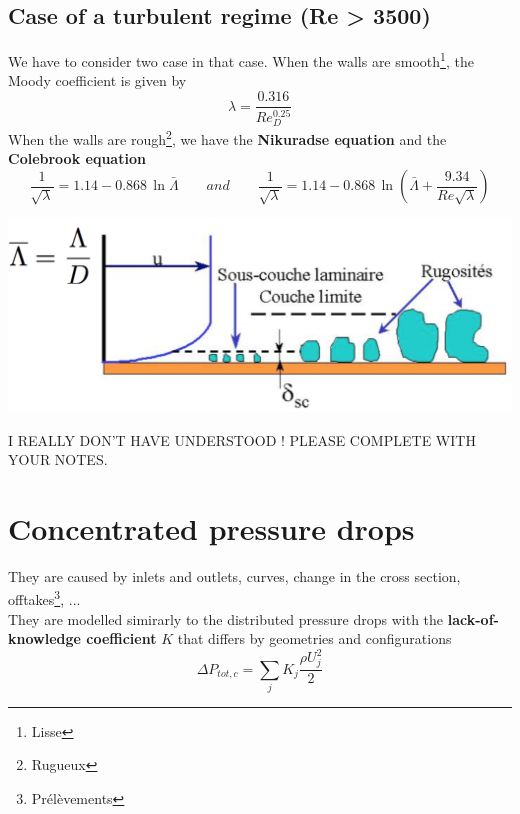 	\subsection{Case of a turbulent regime (Re > 3500)}
		We have to consider two case in that case. When the walls are smooth\footnote{Lisse}, the Moody coefficient is given by 
		\begin{equation}
			\lambda = \frac{0.316}{Re_D^{0.25}}
		\end{equation}
		When the walls are rough\footnote{Rugueux}, we have the \textbf{Nikuradse equation} and the \textbf{Colebrook equation}
		\begin{equation}
			\frac{1}{\sqrt{\lambda}} = 1.14 - 0.868 \, \ln \bar{\Lambda}
			\qquad and \qquad
			\frac{1}{\sqrt{\lambda}} = 1.14 - 0.868 \, \ln \left(\bar{\Lambda}+\frac{9.34}{Re\sqrt{\lambda}} \right)
		\end{equation}
\begin{center}
		\includegraphics[scale=0.4]{ch2/7}
\end{center}
I REALLY DON'T HAVE UNDERSTOOD ! PLEASE COMPLETE WITH YOUR NOTES.

\section{Concentrated pressure drops}
	They are caused by inlets and outlets, curves, change in the cross section, offtakes\footnote{Prélèvements}, ... \\
	They are modelled simirarly to the distributed pressure drops with the \textbf{lack-of-knowledge coefficient} $K$ that differs by geometries and configurations
	\begin{equation}
		\Delta P_{tot,c} = \sum _j K_j \frac{\rho U_j^2}{2}
	\end{equation}
	
